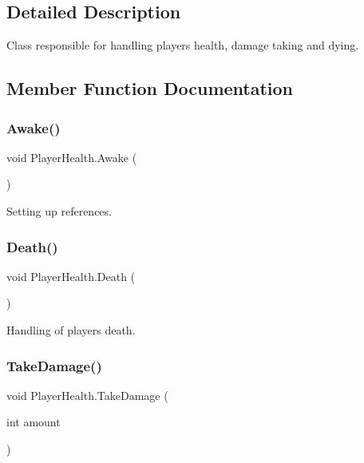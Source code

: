 \subsection{Detailed Description}
Class responsible for handling player\textquotesingle{}s health, damage taking and dying. 

\subsection{Member Function Documentation}
\mbox{\label{class_player_health_a5de7909cbaba3f4da83878ed56e995d0}} 
\subsubsection{\texorpdfstring{Awake()}{Awake()}}
{\footnotesize\ttfamily void Player\+Health.\+Awake (\begin{DoxyParamCaption}{ }\end{DoxyParamCaption})\hspace{0.3cm}{\ttfamily [private]}}



Setting up references. 

\mbox{\label{class_player_health_a0a4b5c4a0184cbe9b8a5af76764cf343}} 
\subsubsection{\texorpdfstring{Death()}{Death()}}
{\footnotesize\ttfamily void Player\+Health.\+Death (\begin{DoxyParamCaption}{ }\end{DoxyParamCaption})\hspace{0.3cm}{\ttfamily [private]}}



Handling of player\textquotesingle{}s death. 

\mbox{\label{class_player_health_a93c7a5b0a1baade297356b1f3341daf5}} 
\subsubsection{\texorpdfstring{TakeDamage()}{TakeDamage()}}
{\footnotesize\ttfamily void Player\+Health.\+Take\+Damage (\begin{DoxyParamCaption}\item[{int}]{amount }\end{DoxyParamCaption})}



